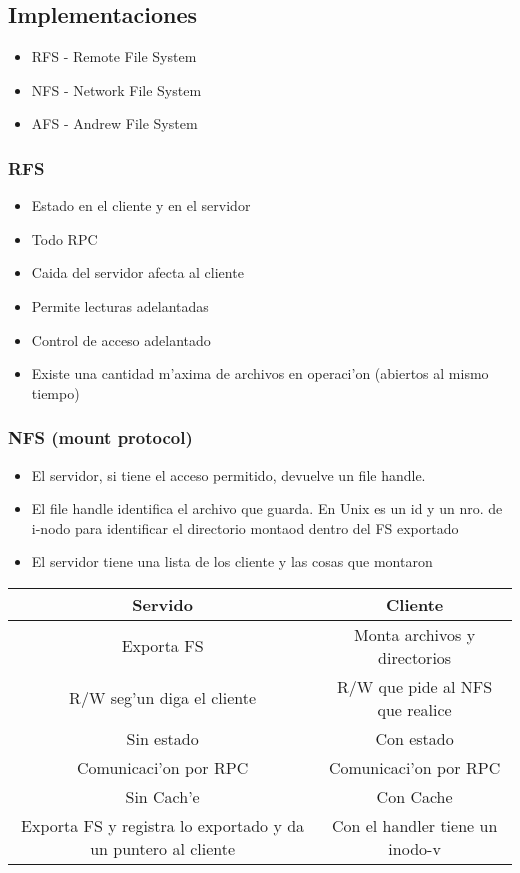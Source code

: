 \documentclass[a4paper,spanish]{article}
\begin{document}
\subsection{Implementaciones}
\begin{itemize}
	\item RFS - Remote File System
	\item NFS - Network File System
	\item AFS - Andrew File System
\end{itemize}

\subsubsection{RFS}
\begin{itemize}
	\item Estado en el cliente y en el servidor
	\item Todo RPC
	\item Caida del servidor afecta al cliente
	\item Permite lecturas adelantadas
	\item Control de acceso adelantado
	\item Existe una cantidad m'axima de archivos en operaci'on (abiertos
al mismo tiempo)
\end{itemize}

\subsubsection{NFS (mount protocol)}
\begin{itemize}
	\item El servidor, si tiene el acceso permitido, devuelve un file handle.
	\item El file handle identifica el archivo que guarda. En Unix es un id
y un nro. de i-nodo para identificar el directorio montaod dentro del FS
exportado
	\item El servidor tiene una lista de los cliente y las cosas que
montaron
\end{itemize}

\begin{tabular}{|c|c|}
\hline
Servido			& Cliente \\ \hline
Exporta FS		& Monta archivos y directorios \\
R/W seg'un diga el cliente	& R/W que pide al NFS que realice \\
Sin estado			& Con estado \\
Comunicaci'on por RPC		& Comunicaci'on por RPC \\
Sin Cach'e			& Con Cache \\
Exporta FS y registra lo exportado y da un puntero al cliente & Con el handler
tiene un inodo-v\\
\hline
\end{tabular}
\end{document}
